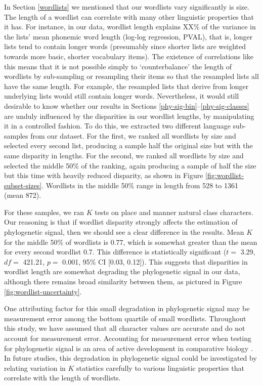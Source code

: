 In Section \ref{wordlists} we mentioned that our wordlists vary significantly is size. The length of a wordlist can correlate with many other linguistic properties that it has. For instance, in our data, wordlist length explains XX\% of the variance in the lists' mean phonemic word length (log-log regression, PVAL), that is, longer lists tend to contain longer words (presumably since shorter lists are weighted towards more basic, shorter vocabulary items). The existence of correlations like this means that it is not possible simply to `counterbalance' the length of wordlists by sub-sampling or resampling their items so that the resampled lists all have the same length. For example, the resampled lists that derive from longer underlying lists would still contain longer words. Nevertheless, it would still desirable to know whether our results in Sections \ref{phy-sig-bin}--\ref{phy-sig-classes} are unduly influenced by the disparities in our wordlist lengths, by manipulating it in a controlled fashion. To do this, we extracted two different language sub-samples from our dataset. For the first, we ranked all wordlists by size and selected every second list, producing a sample half the original size but with the same disparity in lengths. For the second, we ranked all wordlists by size and selected the middle 50\% of the ranking, again producing a sample of half the size but this time with heavily reduced disparity, as shown in Figure \ref{fig:wordlist-subset-sizes}. Wordlists in the middle 50\% range in length from 528 to 1361 (mean 872).

For these samples, we ran \(K\) tests on place and manner natural class characters. Our reasoning is that if wordlist disparity strongly affects the estimation of phylogenetic signal, then we should see a clear difference in the results. Mean \(K\) for the middle 50\% of wordlists is 0.77, which is somewhat greater than the mean for every second wordlist 0.7. This difference is statistically significant (\(t=\) 3.29, \(df=\) 421.21, \(p=\) 0.001, 95\% CI {[}0.03, 0.12{]}). This suggests that disparities in wordlist length are somewhat degrading the phylogenetic signal in our data, although there remains broad similarity between them, as pictured in Figure \ref{fig:wordlist-uncertainty}.

One attributing factor for this small degradation in phylogenetic signal may be measurement error among the bottom quartile of small wordlists. Throughout this study, we have assumed that all character values are accurate and do not account for measurement error. Accounting for measurement error when testing for phylogenetic signal is an area of active development in comparative biology \autocite{zheng_new_2009}. In future studies, this degradation in phylogenetic signal could be investigated by relating variation in \(K\) statistics carefully to various linguistic properties that correlate with the length of wordlists.

